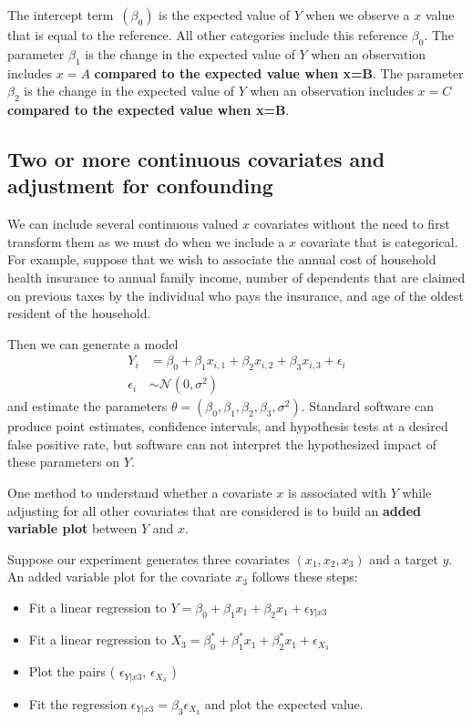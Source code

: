The intercept term~$(\beta_{0})$ is the expected value of $Y$ when we observe a $x$ value that is equal to the reference. 
All other categories include this reference $\beta_{0}$.
The parameter $\beta_{1}$ is the change in the expected value of $Y$  when an observation includes $x=A$  \textbf{compared to the expected value when x=B}.
The parameter $\beta_{2}$ is the change in the expected value of $Y$  when an observation includes $x=C$  \textbf{compared to the expected value when x=B}.

\subsection{Two or more continuous covariates and adjustment for confounding}

We can include several continuous valued $x$ covariates without the need to first transform them as we must do when we include a $x$ covariate that is categorical.
For example, suppose that we wish to associate the annual cost of household health insurance to annual family income, number of dependents that are claimed on previous taxes by the individual who pays the insurance, and age of the oldest resident of the household. 

Then we can generate a model 
\begin{align}
    Y_{i} &= \beta_{0} + \beta_{1} x_{i,1} + \beta_{2}x_{i,2} + \beta_{3} x_{i,3} + \epsilon_{i}\\
    \epsilon_{i} &\sim \mathcal{N}(0,\sigma^{2})    
\end{align}
and estimate the parameters $\theta = (\beta_{0}, \beta_{1}, \beta_{2}, \beta_{3}, \sigma^{2})$.
Standard software can produce point estimates, confidence intervals, and hypothesis tests at a desired false positive rate, but software can not interpret the hypothesized impact of these parameters on $Y$. 

One method to understand whether a covariate $x$ is associated with $Y$ while adjusting for all other covariates that are considered is to build an \textbf{added variable plot} between $Y$ and $x$.

Suppose our experiment generates three covariates $(x_{1}, x_{2}, x_{3})$ and a target $y$.
An added variable plot for the covariate $x_{3}$ follows these steps:
\begin{itemize}
    \item Fit a linear regression to $Y    = \beta_{0} + \beta_{1}x_{1}+ \beta_{2}x_{1} + \epsilon_{Y|x3}$
    \item Fit a linear regression to $X_{3} = \beta^{*}_{0} + \beta^{*}_{1}x_{1}+ \beta^{*}_{2}x_{1} + \epsilon_{X_{3}}$
    \item Plot the pairs ( $\epsilon_{Y|x3}$, $\epsilon_{X_{3}}$ )
    \item Fit the regression $\epsilon_{Y|x3} = \beta_{3} \epsilon_{X_{3}}$ and plot the expected value. 
\end{itemize}

